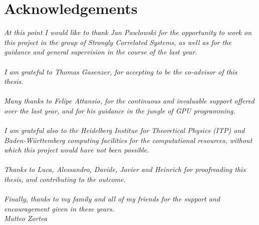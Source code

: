 \documentclass[
11pt, %
english, %
singlespacing, %
headsepline, %
]{MastersDoctoralThesis} %
\begin{document}




\mainmatter %

\pagestyle{thesis} %











\chapter*{Acknowledgements}
\thispagestyle{empty}
\vspace*{0.2\textheight}
\noindent\textit{At this point I would like to thank Jan Pawlowski for the opportunity to work on this project in the group of Strongly Correlated Systems, as well as for the guidance and general supervision in the course of the last year. \\~\\ 
I am grateful to Thomas Gasenzer, for accepting to be the co-advisor of this thesis. \\~\\ 
Many thanks to Felipe Attansio, for the continuous and invaluable support offered over the last year, and for his guidance in the jungle of GPU programming. \\~\\
I am grateful also to the Heidelberg Institue for Theoretical Physics (ITP) and Baden-W\"urttemberg computing facilities for the computational resources, without which this project would have not been possible. \\~\\
Thanks to Luca, Alessandro, Davide, Javier and Heinrich for proofreading this thesis, and contributing to the outcome. \\~\\ 
Finally, thanks to my family and all of my friends for the support and encouragement given in these years. \\[3cm]
\vspace{50pt}
\hfill Matteo Zortea}
\end{document}
